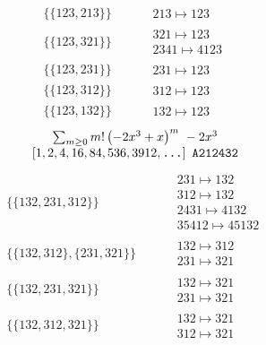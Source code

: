 \begin{tiny}
\begin{align}
\{\{123, 213\}\}
\quad
&
\phantom{.}
&
\begin{matrix}
213 \mapsto 123
\end{matrix}
\\
\{\{123, 321\}\}
\quad
&
\phantom{.}
&
\begin{matrix}
321 \mapsto 123\\2341 \mapsto 4123
\end{matrix}
\\
\{\{123, 231\}\}
\quad
&
\phantom{.}
&
\begin{matrix}
231 \mapsto 123
\end{matrix}
\\
\{\{123, 312\}\}
\quad
&
\phantom{.}
&
\begin{matrix}
312 \mapsto 123
\end{matrix}
\\
\{\{123, 132\}\}
\quad
&
\phantom{.}
&
\begin{matrix}
132 \mapsto 123
\end{matrix}
\end{align}
$$
\begin{matrix}
\sum_{m \geq 0} m! \left(
-2 x^{3} + x
\right)^m
\ 
-2 x^{3}
\\
\left[1, 2, 4, 16, 84, 536, 3912, \text{\texttt{...}}\right]
\ 
\texttt{A212432}
\end{matrix}
$$
\vspace{-1em}
\begin{align}
\{\{132, 231, 312\}\}
\quad
&
\phantom{.}
&
\begin{matrix}
231 \mapsto 132\\312 \mapsto 132\\2431 \mapsto 4132\\35412 \mapsto 45132
\end{matrix}
\\
\{\{132, 312\}, \{231, 321\}\}
\quad
&
\phantom{.}
&
\begin{matrix}
132 \mapsto 312\\231 \mapsto 321
\end{matrix}
\\
\{\{132, 231, 321\}\}
\quad
&
\phantom{.}
&
\begin{matrix}
132 \mapsto 321\\231 \mapsto 321
\end{matrix}
\\
\{\{132, 312, 321\}\}
\quad
&
\phantom{.}
&
\begin{matrix}
132 \mapsto 321\\312 \mapsto 321

\end{matrix}
\end{align}
\end{tiny}
